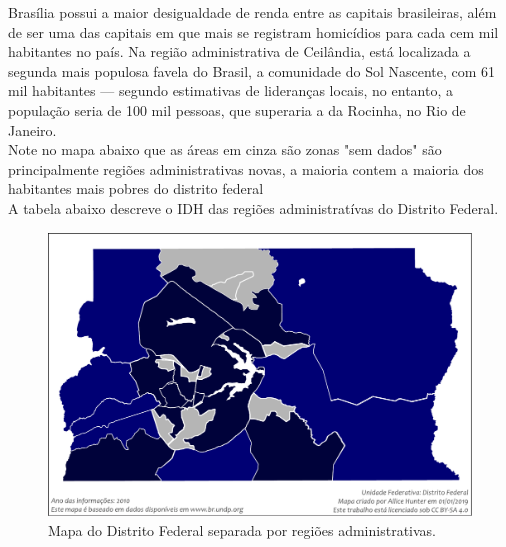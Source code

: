 Brasília possui a maior desigualdade de renda entre as capitais brasileiras, além de ser uma das capitais em que mais se registram homicídios para cada cem mil habitantes no país. Na região administrativa de Ceilândia, está localizada a segunda mais populosa favela do Brasil, a comunidade do Sol Nascente, com 61 mil habitantes — segundo estimativas de lideranças locais, no entanto, a população seria de 100 mil pessoas, que superaria a da Rocinha, no Rio de Janeiro.\\

Note no mapa abaixo que as áreas em cinza são zonas "sem dados" são principalmente regiões administrativas novas, a maioria contem a maioria dos habitantes mais pobres do distrito federal\\

A tabela abaixo descreve o IDH das regiões administratívas do Distrito Federal.\\


\begin{figure}[h!]
    \centering
    \includegraphics[width=0.6\linewidth]{2-caps/cap02/Mapa_do_IDH_do_Distrito_Federal_(2010)}
    \caption{Mapa do Distrito Federal separada por regiões administrativas.}
    \label{fig:mapadoidhdodistritofederal2010}
\end{figure}

